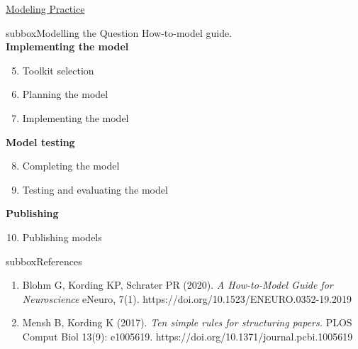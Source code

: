 \begin{textbox}{\href{https://compneuro.neuromatch.io/projects/modelingsteps/ModelingSteps_5through10.html}{Modeling Practice } }
\begin{subbox}{subbox}{Modelling the Question}
\scriptsize
How-to-model guide. \\
\textbf{Implementing the model}
\begin{enumerate}
  \setcounter{enumi}{4}
    \item  Toolkit selection
   \item  Planning the model
   \item  Implementing the model
   \end{enumerate}
\textbf{Model testing}
  
\begin{enumerate}
  \setcounter{enumi}{7}
\item Completing the model
\item Testing and evaluating the model
\end{enumerate}
\textbf{Publishing}

\begin{enumerate}
  \setcounter{enumi}{9}
\item Publishing models

\end{enumerate}

\end{subbox}
\begin{subbox}{subbox}{References}
\scriptsize

\begin{enumerate}
 \item  Blohm G, Kording KP, Schrater PR (2020). \textit{A How-to-Model Guide for Neuroscience} eNeuro, 7(1). https://doi.org/10.1523/ENEURO.0352-19.2019 

\item Mensh B, Kording K (2017). \textit{Ten simple rules for structuring papers.} PLOS Comput Biol 13(9): e1005619. https://doi.org/10.1371/journal.pcbi.1005619


\end{enumerate}

\end{subbox}
\end{textbox}

